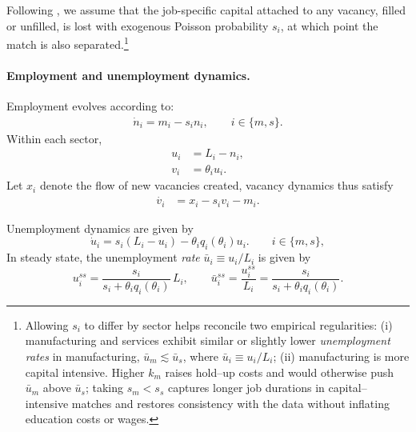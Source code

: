 \documentclass[12pt]{article} %
\theoremstyle{definition}
\begin{document}
Following \cite{acemoglu1999holdups}, we assume that the job-specific capital attached to any vacancy, filled or unfilled, is lost with exogenous Poisson probability $s_i$, at which point the match is also separated.\footnote{Allowing $s_i$ to differ by sector helps reconcile two empirical regularities: (i) manufacturing and services exhibit similar or slightly lower \emph{unemployment rates} in manufacturing, $\bar u_m \lesssim \bar u_s$, where $\bar u_i\equiv u_i/L_i$; (ii) manufacturing is more capital intensive. Higher $k_m$ raises hold–up costs and would otherwise push $\bar u_m$ above $\bar u_s$; taking $s_m<s_s$ captures longer job durations in capital–intensive matches and restores consistency with the data without inflating education costs or wages.} 

\paragraph{Employment and unemployment dynamics.}
 Employment evolves according to:
\begin{align}
    \dot{n}_i = m_i -s_in_i,  \qquad i\in\{m,s\}.
\end{align}
 Within each sector, 
 \begin{align}
     u_i &= L_i-n_i,\\
     v_i & = \theta_i u_i.
 \end{align}
 Let $x_i$ denote the flow of new vacancies created, vacancy dynamics thus satisfy
 \begin{align}
    \dot{v_i} &= x_i- s_iv_i- m_i.
\end{align}

\noindent Unemployment dynamics are given by
\[
\dot u_i = s_i(L_i-u_i)-\theta_i q_i(\theta_i)u_i.
\qquad i\in\{m,s\},
\]
In steady state, the unemployment \emph{rate}  $\bar u_i\equiv u_i/L_i$ is given by 
\begin{equation}\label{u_dynamics}
u_i^{ss}=\frac{s_i}{s_i+\theta_i q_i(\theta_i)}\,L_i,
\qquad
\bar u_i^{ss}=\frac{u_i^{ss}}{L_i}=\frac{s_i}{s_i+\theta_i q_i(\theta_i)}.
\end{equation}
\end{document}

